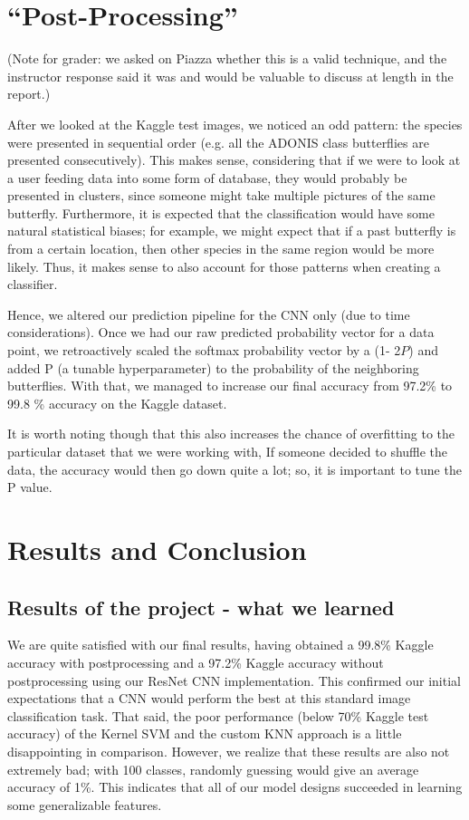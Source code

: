 \documentclass[10pt]{article} %
\begin{document}
\section{``Post-Processing''} \label{sec: post-proc}
(Note for grader: we asked on Piazza whether this is a valid technique, and the instructor response said it was and would be valuable to discuss at length in the report.)

After we looked at the Kaggle test images, we noticed an odd pattern: the species were presented in sequential order (e.g. all the ADONIS class butterflies are presented consecutively). This makes sense, considering that if we were to look at a user feeding data into some form of database, they would probably be presented in clusters, since someone might take multiple pictures of the same butterfly. Furthermore, it is expected that the classification would have some natural statistical biases; for example, we might expect that if a past butterfly is from a certain location, then other species in the same region would be more likely. Thus, it makes sense to also account for those patterns when creating a classifier.

Hence, we altered our prediction pipeline for the CNN only (due to time considerations). Once we had our raw predicted probability vector for a data point, we retroactively scaled the softmax probability vector by a (1- 2$P$) and added P (a tunable hyperparameter) to the probability of the neighboring butterflies. With that, we managed to increase our final accuracy from 97.2\% to 99.8 \% accuracy on the Kaggle dataset. \par
It is worth noting though that this also increases the chance of overfitting to the particular dataset that we were working with, If someone decided to shuffle the data, the accuracy would then go down quite a lot; so, it is important to tune the P value. \par

\section{Results and Conclusion}
\subsection{Results of the project - what we learned}
We are quite satisfied with our final results, having obtained a 99.8\% Kaggle accuracy with postprocessing and a 97.2\% Kaggle accuracy without postprocessing using our ResNet CNN implementation. This confirmed our initial expectations that a CNN would perform the best at this standard image classification task. That said, the poor performance (below 70\% Kaggle test accuracy) of the Kernel SVM and the custom KNN approach is a little disappointing in comparison. However, we realize that these results are also not extremely bad; with 100 classes, randomly guessing would give an average accuracy of 1\%. This indicates that all of our model designs succeeded in learning some generalizable features.
\end{document}

